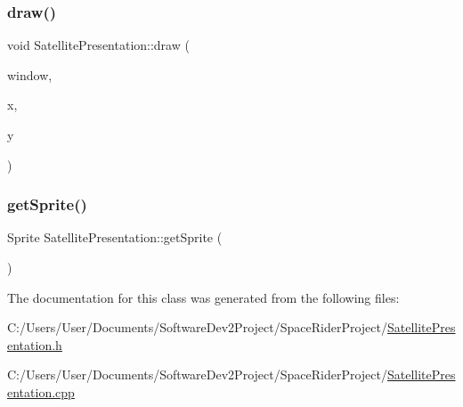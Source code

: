 \subsubsection{\texorpdfstring{draw()}{draw()}}
{\footnotesize\ttfamily void Satellite\+Presentation\+::draw (\begin{DoxyParamCaption}\item[{Render\+Window \&}]{window,  }\item[{float}]{x,  }\item[{float}]{y }\end{DoxyParamCaption})}

\mbox{\label{class_satellite_presentation_ac30edf373faa3704877688882e1feb3b}} 
\subsubsection{\texorpdfstring{get\+Sprite()}{getSprite()}}
{\footnotesize\ttfamily Sprite Satellite\+Presentation\+::get\+Sprite (\begin{DoxyParamCaption}{ }\end{DoxyParamCaption})}



The documentation for this class was generated from the following files\+:\begin{DoxyCompactItemize}
\item 
C\+:/\+Users/\+User/\+Documents/\+Software\+Dev2\+Project/\+Space\+Rider\+Project/\hyperlink{_satellite_presentation_8h}{Satellite\+Presentation.\+h}\item 
C\+:/\+Users/\+User/\+Documents/\+Software\+Dev2\+Project/\+Space\+Rider\+Project/\hyperlink{_satellite_presentation_8cpp}{Satellite\+Presentation.\+cpp}\end{DoxyCompactItemize}

